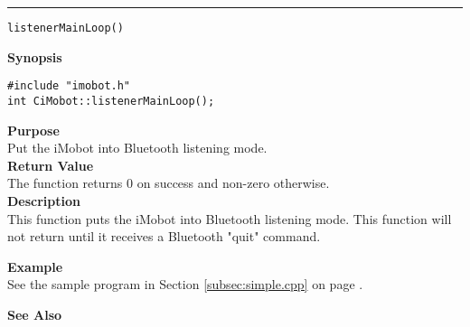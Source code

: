 \noindent
\vspace{5pt}
\rule{6.5in}{0.015in}
\noindent
{\LARGE \texttt{listenerMainLoop()}}\\
{}

\noindent
{\bf Synopsis}\\
\begin{verbatim}
#include "imobot.h"
int CiMobot::listenerMainLoop();
\end{verbatim}

\noindent
{\bf Purpose}\\
Put the iMobot into Bluetooth listening mode.\\

\noindent
{\bf Return Value}\\
The function returns 0 on success and non-zero otherwise.\\

\noindent
{\bf Description}\\
This function puts the iMobot into Bluetooth listening mode. This function will
not return until it receives a Bluetooth "quit" command.

\noindent
{\bf Example}\\
See the sample program in Section \ref{subsec:simple.cpp} on page \pageref{subsec:simple.cpp}.
\noindent

\noindent
{\bf See Also}\\

